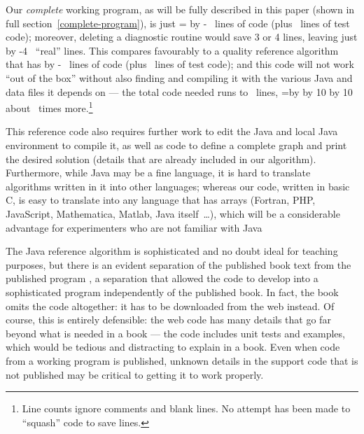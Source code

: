 \documentclass[prodmode,acmtecs]{acmsmall} %
\begin{document}
\newcount\linesofcode
Our \emph{complete\/} working program, as will be fully described in this paper (shown in full section~\ref{complete-program}), is just 
\newcount\denom \denom=\linesofcode
\ifnum {}  %
\fi
\newcount\testcode 
{} \advance\linesofcode by -\testcode
\the\linesofcode\ lines of code  (plus \the\testcode\ lines of test code); moreover, deleting a diagnostic routine would save 3 or 4 lines, leaving just
\advance \linesofcode by -4 \the\linesofcode\ ``real'' lines. This compares favourably to a quality reference algorithm \cite{sedgewickcode} that has 
 \advance\linesofcode by -\testcode
\the\linesofcode\ lines of code (plus \the\testcode\ lines of test code); and this code will not work ``out of the box'' without also finding and compiling it with the various Java and data files it depends on --- the total code needed runs to   
\the\linesofcode\ lines,  
\newcount\ratio \ratio=\linesofcode \divide\ratio by \denom \divide \ratio by 10 \multiply \ratio by 10
about \the\ratio\ times more.\footnote{Line counts ignore comments and blank lines. No attempt has been made to ``squash'' code to save lines.} 

This reference code also requires further work to edit the Java and local Java environment to compile it, as well as code to define a complete graph and print the desired solution (details that are already included in our algorithm). Furthermore, while Java may be a fine language, it is hard to translate algorithms written in it into other languages; whereas our code, written in basic C, is easy to translate into any language that has arrays (Fortran, PHP, JavaScript, Mathematica, Matlab, Java itself~\ldots), which will be a considerable advantage for experimenters who are not familiar with Java

The Java reference algorithm is sophisticated and no doubt ideal for teaching purposes, but there is an evident separation of the published book text \cite{sedgewickbook} from the published program \cite{sedgewickcode}, a separation that allowed the code to develop into a sophisticated program independently of the published book. In fact, the book omits the code altogether: it has to be downloaded from the web instead. Of course, this is entirely defensible: the web code has many details that go far beyond what is needed in a book --- the code includes unit tests and examples, which would be tedious and distracting to explain in a book. Even when code from a working program is published, unknown details in the support code that is not published may be critical to getting it to work properly.
\end{document}
